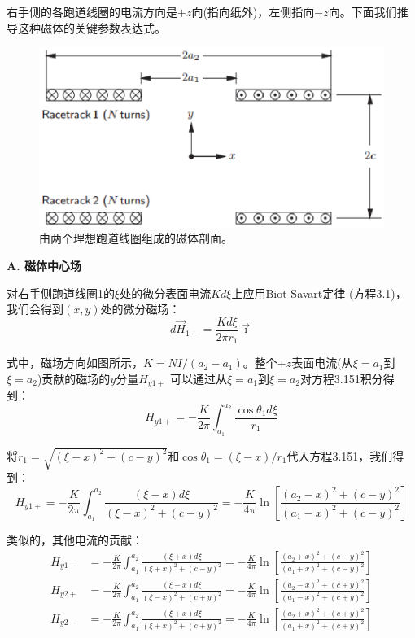 右手侧的各跑道线圈的电流方向是$+z$向(指向纸外)，左侧指向$-z$向。下面我们推导这种磁体的关键参数表达式。
\begin{figure}[htbp]
	\centering
	\includegraphics[scale=0.6]{chpt3/figs/fig3.36.eps}
	\caption{由两个理想跑道线圈组成的磁体剖面。}
\end{figure}

\textbf{A. 磁体中心场}

对右手侧跑道线圈1的$\xi$处的微分表面电流$Kd\xi$上应用Biot-Savart定律 (方程3.1)，
我们会得到$(x,y)$处的微分磁场：
\begin{equation}
d\vec{H}_{1+}=\frac{K d\xi}{2\pi r_{1}}\vec{\imath}%
\end{equation}

式中，磁场方向如图所示，$K=NI/(a_2-a_1)$。整个$+z$表面电流(从$\xi=a_1$到$\xi=a_2$)贡献的磁场的$y$分量$H_{y1+}$
可以通过从$\xi=a_1$到$\xi=a_2$对方程3.151积分得到：
\begin{equation}
H_{y1+}=-\frac{K}{2\pi}\int_{a_{1}}^{a_{2}}\frac{\cos\theta_{1}d\xi}{r_{1}}%
\end{equation}

将$r_1=\sqrt{(\xi−x)^2+(c−y)^2}$和$\cos\theta_1=(\xi−x)/r_1$代入方程3.151，我们得到：
\begin{equation}
H_{y1+}=-\frac{K}{2\pi}\int_{a_{1}}^{a_{2}}\frac{(\xi-x)d\xi}{(\xi-x)^2+(c-y)^2}=
-\frac{K}{4\pi}\ln\left[\frac{(a_2-x)^2+(c-y)^2}{(a_1-x)^2+(c-y)^2}\right]%
\end{equation}

类似的，其他电流的贡献：
\begin{align*}
H_{y1-}&=-\frac{K}{2\pi}\int_{a_{1}}^{a_{2}}\frac{(\xi+x)d\xi}{(\xi+x)^{2}+(c-y)^{2}}=-\frac{K}{4\pi}\ln\left[\frac{(a_{2}+x)^{2}+(c-y)^{2}}{(a_{1}+x)^{2}+(c-y)^{2}}\right]\tag{3.152b}\\%
H_{y2+}&=-\frac{K}{2\pi}\int_{a_{1}}^{a_{2}}\frac{(\xi-x)d\xi}{(\xi-x)^{2}+(c+y)^{2}}=-\frac{K}{4\pi}\ln\left[\frac{(a_{2}-x)^{2}+(c+y)^{2}}{(a_{1}-x)^{2}+(c+y)^{2}}\right]\tag{3.152c}\\%
H_{y2-}&=-\frac{K}{2\pi}\int_{a_{1}}^{a_{2}}\frac{(\xi+x)d\xi}{(\xi+x)^{2}+(c+y)^{2}}=-\frac{K}{4\pi}\ln\left[\frac{(a_{2}+x)^{2}+(c+y)^{2}}{(a_{1}+x)^{2}+(c+y)^{2}}\right]\tag{3.152d}%
\end{align*}

